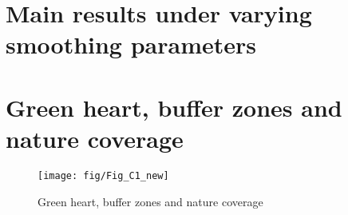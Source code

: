 \documentclass[a4paper,authoryear,review]{elsarticle}  	%
\begin{document}
\newpage	
\section[Appendix E]{Main results under varying smoothing parameters}\label{appe_new}	
	

\newpage
\section[Appendix F]{Green heart, buffer zones and nature coverage}\label{appf}

	\begin{figure}[!hbtp]
		\centering
		\caption{Green heart, buffer zones and nature coverage}
		\texttt{[image: fig/Fig\_C1\_new]}	
		\label{appf:fig:1}
	\end{figure}
\end{document}

